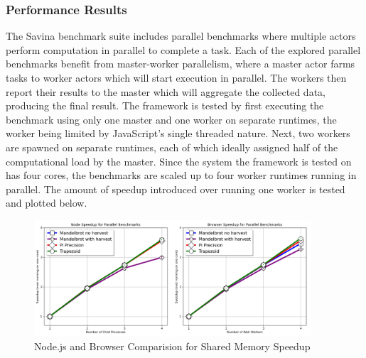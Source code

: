 \documentclass[12pt, a4paper]{report}
\theoremstyle{definition}
\theoremstyle{definition}%
\theoremstyle{definition}%
\theoremstyle{definition}%
\theoremstyle{definition}%
\theoremstyle{definition}%
\begin{document}
\subsubsection{Performance Results}
The Savina benchmark suite includes parallel benchmarks where multiple actors perform computation in parallel to complete a task. Each of the explored parallel benchmarks benefit from master-worker parallelism, where a master actor farms tasks to worker actors which will start execution in parallel. The workers then report their results to the master which will aggregate the collected data, producing the final result. The framework is tested by first executing the benchmark using only one master and one worker on separate runtimes, the worker being limited by JavaScript’s single threaded nature.  Next, two workers are spawned on separate runtimes, each of which ideally assigned half of the computational load by the master. Since the system the framework is tested on has four cores, the benchmarks are scaled up to four worker runtimes running in parallel. The amount of speedup introduced over running one worker is tested and plotted below.
\begin{figure}[H]
    \begin{centering}
        \includegraphics[width=390px]{resources/shared_memory_speedup.png}
        \caption{Node.js and Browser Comparision for Shared Memory Speedup}
    \end{centering}
\end{figure}
\end{document}
